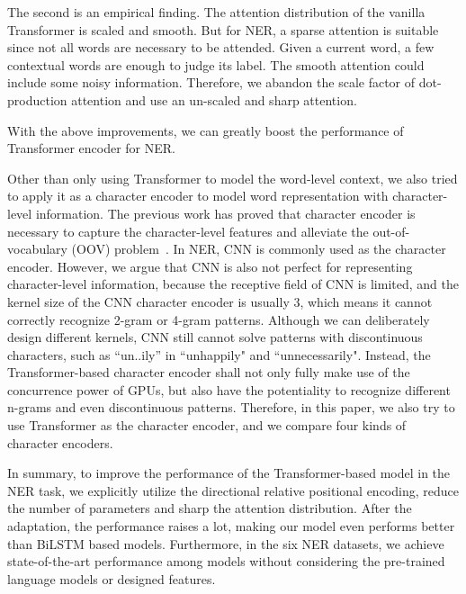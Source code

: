\documentclass[11pt,a4paper]{article}
\begin{document}
The second is an empirical finding. The attention distribution of the vanilla Transformer is scaled and smooth. But for NER, a sparse attention is suitable since not all words are necessary to be attended. Given a current word, a few contextual words are enough to judge its label. The smooth attention could include some noisy information. Therefore, we abandon the scale factor of dot-production attention and use an un-scaled and sharp attention.

With the above improvements, we can greatly boost the performance of Transformer encoder for NER.

Other than only using Transformer to model the word-level context, we also tried to apply it as a character encoder to model word representation with character-level information.
The previous work has proved that character encoder is necessary to capture the character-level features and alleviate the out-of-vocabulary (OOV) problem~\cite{lample2016neural,ma2016end,DBLP:journals/tacl/ChiuN16,DBLP:conf/emnlp/XinHMR18}. In NER, CNN is commonly used as the character encoder.
However, we argue that CNN is also not perfect for representing character-level information, because the receptive field of CNN is limited, and the kernel size of the CNN character encoder is usually 3, which means it cannot correctly recognize 2-gram or 4-gram patterns. Although we can deliberately design different kernels, CNN still cannot solve patterns with discontinuous characters, such as ``un..ily'' in  ``unhappily" and ``unnecessarily". Instead, the Transformer-based character encoder shall not only fully make use of the concurrence power of GPUs, but also have the potentiality to recognize different n-grams and even discontinuous patterns. Therefore, in this paper, we also try to use Transformer as the character encoder, and we compare four kinds of character encoders.





In summary, to improve the performance of the Transformer-based model in the NER task, we explicitly utilize the directional relative positional encoding, reduce the number of parameters and sharp the attention distribution. After the adaptation, the performance raises a lot, making our model even performs better than BiLSTM based models. Furthermore, in the six NER datasets, we achieve state-of-the-art performance among models without considering the pre-trained language models or designed features.
\end{document}
